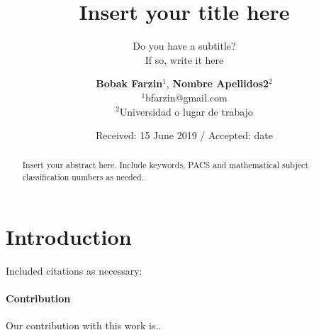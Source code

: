 \documentclass[smallcondensed]{svjour3}     %
\begin{document}
\title{Insert your title here%
}
\subtitle{Do you have a subtitle?\\ If so, write it here}


\author {\textbf{Bobak Farzin$^1$}, \textbf{Nombre Apellidos2$^2$}\\
	$^1$bfarzin@gmail.com\\
	$^2$Universidad o lugar de trabajo\\
}




\date{Received: 15 June 2019 / Accepted: date}


\maketitle

\begin{abstract}
Insert your abstract here. Include keywords, PACS and mathematical
subject classification numbers as needed.
\end{abstract}

\section{Introduction}
\label{intro}
Included citations as necessary: ~\cite{Nobody06}
\paragraph{Contribution} Our contribution with this work is..
\end{document}
